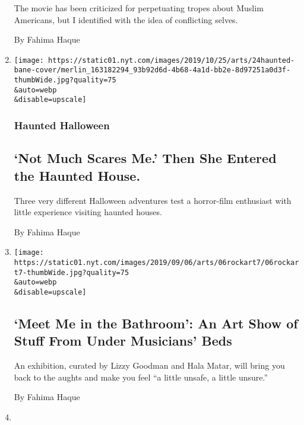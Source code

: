 \begin{enumerate}
  The movie has been criticized for perpetuating tropes about Muslim
  Americans, but I identified with the idea of conflicting selves.

  By Fahima Haque
\item
  \href{/2019/10/24/arts/haunted-houses-halloween.html}{}

  \texttt{[image: https://static01.nyt.com/images/2019/10/25/arts/24haunted-bane-cover/merlin\_163182294\_93b92d6d-4b68-4a1d-bb2e-8d97251a0d3f-thumbWide.jpg?quality=75\\\&auto=webp\\\&disable=upscale]}

  \hypertarget{haunted-halloween}{%
  \subsubsection{Haunted Halloween}\label{haunted-halloween}}

  \hypertarget{not-much-scares-me-then-she-entered-the-haunted-house}{%
  \subsection{`Not Much Scares Me.' Then She Entered the Haunted
  House.}\label{not-much-scares-me-then-she-entered-the-haunted-house}}

  Three very different Halloween adventures test a horror-film
  enthusiast with little experience visiting haunted houses.

  By Fahima Haque
\item
  \href{/2019/09/05/arts/design/meet-me-in-the-bathroom-art-show.html}{}

  \texttt{[image: https://static01.nyt.com/images/2019/09/06/arts/06rockart7/06rockart7-thumbWide.jpg?quality=75\\\&auto=webp\\\&disable=upscale]}

  \hypertarget{meet-me-in-the-bathroom-an-art-show-of-stuff-from-under-musicians-beds}{%
  \subsection{`Meet Me in the Bathroom': An Art Show of Stuff From Under
  Musicians'
  Beds}\label{meet-me-in-the-bathroom-an-art-show-of-stuff-from-under-musicians-beds}}

  An exhibition, curated by Lizzy Goodman and Hala Matar, will bring you
  back to the aughts and make you feel ``a little unsafe, a little
  unsure.''

  By Fahima Haque
\item
  \href{/2018/05/11/us/racism-america-experiences.html}{}


\end{enumerate}
